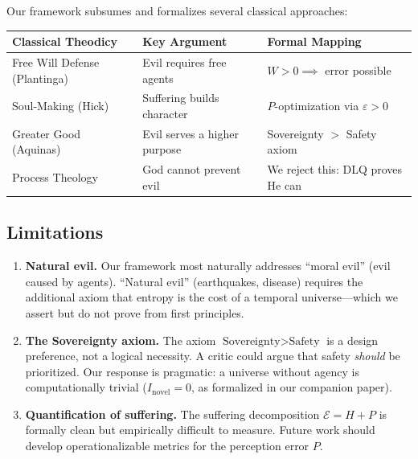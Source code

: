 \documentclass[12pt, a4paper]{article}
\theoremstyle{plain}
\theoremstyle{definition}
\theoremstyle{remark}
\newcommand{\calE}{\mathcal{E}}
\begin{document}
Our framework subsumes and formalizes several classical approaches:

\begin{center}
\begin{tabular}{lll}
  \toprule
  \textbf{Classical Theodicy} & \textbf{Key Argument} & \textbf{Formal Mapping} \\
  \midrule
  Free Will Defense (Plantinga) & Evil requires free agents & $W > 0 \implies$ error possible \\
  Soul-Making (Hick) & Suffering builds character & $P$-optimization via $\varepsilon > 0$ \\
  Greater Good (Aquinas) & Evil serves a higher purpose & Sovereignty $>$ Safety axiom \\
  Process Theology & God cannot prevent evil & We reject this: DLQ proves He can \\
  \bottomrule
\end{tabular}
\end{center}

\subsection{Limitations}

\begin{enumerate}
  \item \textbf{Natural evil.} Our framework most naturally addresses ``moral
    evil'' (evil caused by agents). ``Natural evil'' (earthquakes, disease)
    requires the additional axiom that entropy is the cost of a temporal
    universe---which we assert but do not prove from first principles.

  \item \textbf{The Sovereignty axiom.} The axiom $\text{Sovereignty} >
    \text{Safety}$ is a design preference, not a logical necessity. A
    critic could argue that safety \emph{should} be prioritized. Our
    response is pragmatic: a universe without agency is computationally
    trivial ($I_{\text{novel}} = 0$, as formalized in our
    companion paper).

  \item \textbf{Quantification of suffering.} The suffering decomposition
    $\calE = H + P$ is formally clean but empirically difficult to
    measure. Future work should develop operationalizable metrics for
    the perception error $P$.
\end{enumerate}

\end{document}
